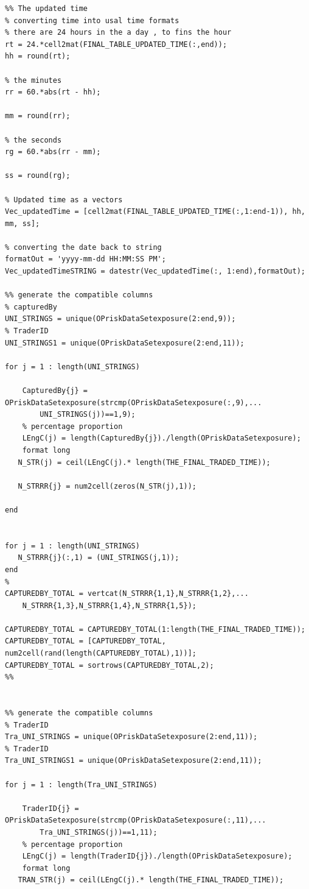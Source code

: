 \documentclass{DissertateUSU}
\begin{document}
\begin{verbatim}
%% The updated time
% converting time into usal time formats
% there are 24 hours in the a day , to fins the hour
rt = 24.*cell2mat(FINAL_TABLE_UPDATED_TIME(:,end));
hh = round(rt);

% the minutes
rr = 60.*abs(rt - hh);

mm = round(rr);

% the seconds
rg = 60.*abs(rr - mm);

ss = round(rg);

% Updated time as a vectors
Vec_updatedTime = [cell2mat(FINAL_TABLE_UPDATED_TIME(:,1:end-1)), hh, mm, ss];

% converting the date back to string
formatOut = 'yyyy-mm-dd HH:MM:SS PM';
Vec_updatedTimeSTRING = datestr(Vec_updatedTime(:, 1:end),formatOut);

%% generate the compatible columns
% capturedBy
UNI_STRINGS = unique(OPriskDataSetexposure(2:end,9));
% TraderID
UNI_STRINGS1 = unique(OPriskDataSetexposure(2:end,11));

for j = 1 : length(UNI_STRINGS)
    
    CapturedBy{j} = OPriskDataSetexposure(strcmp(OPriskDataSetexposure(:,9),...
        UNI_STRINGS(j))==1,9);
    % percentage proportion
    LEngC(j) = length(CapturedBy{j})./length(OPriskDataSetexposure);
    format long
   N_STR(j) = ceil(LEngC(j).* length(THE_FINAL_TRADED_TIME));
   
   N_STRRR{j} = num2cell(zeros(N_STR(j),1));
   
end


for j = 1 : length(UNI_STRINGS)
   N_STRRR{j}(:,1) = (UNI_STRINGS(j,1));
end
%
CAPTUREDBY_TOTAL = vertcat(N_STRRR{1,1},N_STRRR{1,2},...
    N_STRRR{1,3},N_STRRR{1,4},N_STRRR{1,5});

CAPTUREDBY_TOTAL = CAPTUREDBY_TOTAL(1:length(THE_FINAL_TRADED_TIME));
CAPTUREDBY_TOTAL = [CAPTUREDBY_TOTAL, num2cell(rand(length(CAPTUREDBY_TOTAL),1))];
CAPTUREDBY_TOTAL = sortrows(CAPTUREDBY_TOTAL,2);
%%


%% generate the compatible columns
% TraderID
Tra_UNI_STRINGS = unique(OPriskDataSetexposure(2:end,11));
% TraderID
Tra_UNI_STRINGS1 = unique(OPriskDataSetexposure(2:end,11));

for j = 1 : length(Tra_UNI_STRINGS)
    
    TraderID{j} = OPriskDataSetexposure(strcmp(OPriskDataSetexposure(:,11),...
        Tra_UNI_STRINGS(j))==1,11);
    % percentage proportion
    LEngC(j) = length(TraderID{j})./length(OPriskDataSetexposure);
    format long
   TRAN_STR(j) = ceil(LEngC(j).* length(THE_FINAL_TRADED_TIME));
   

\end{verbatim}
\end{document}
